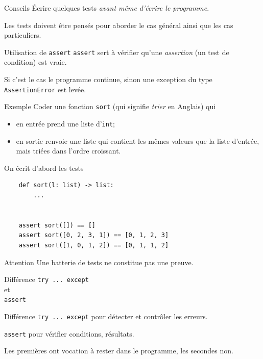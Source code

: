 \documentclass[10pt]{nsibeamer}
\begin{document}
\begin{frame}[fragile]{Conseils}\pause
    Écrire quelques tests \textit{avant même d'écrire le programme}.\\\CurrentFilePathUsed
    
    Les tests doivent être pensés pour aborder le cas général ainsi que les cas particuliers.
\end{frame}

\begin{frame}[fragile]{Utilisation de \texttt{assert}}\pause
    \texttt{assert} sert à vérifier qu'une \textit{assertion} (un test de condition) est vraie.\\\pause
    
    Si c'est le cas le programme continue, sinon une exception du type \texttt{AssertionError} est levée.
    
\end{frame}

\begin{frame}[fragile]{Exemple}\pause
    Coder une fonction \texttt{sort} (qui signifie \textit{trier} en Anglais) qui     
    \begin{itemize}
        \item   en entrée prend une liste d'\texttt{int};
        \item   en sortie renvoie une liste qui contient les mêmes valeurs que la liste d'entrée, mais triées dans l'ordre croissant.
    \end{itemize}
\end{frame}

\begin{frame}[fragile]{On écrit d'abord les tests}\pause
    
    \begin{verbatim}
    def sort(l: list) -> list:
        ...


    assert sort([]) == []
    assert sort([0, 2, 3, 1]) == [0, 1, 2, 3]
    assert sort([1, 0, 1, 2]) == [0, 1, 1, 2]
    \end{verbatim}
\end{frame}

\begin{frame}[fragile]{Attention}
    Une batterie de tests ne constitue pas une preuve.
\end{frame}

\begin{frame}[fragile]
    Différence \texttt{try ... except}\\
    et\\
    \texttt{assert}  
\end{frame}
\begin{frame}[fragile]{Différence}\pause
    \texttt{try ... except} pour détecter et contrôler les erreurs.\\\pause
    
    \texttt{assert} pour vérifier conditions, résultats.\\\pause

    Les premières ont vocation à rester dans le programme, les secondes non.
\end{frame}
\end{document}
